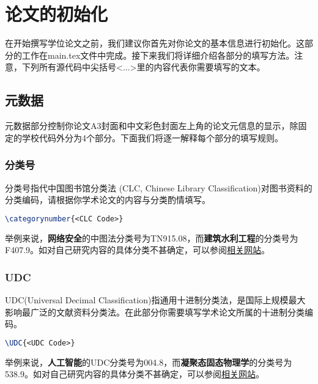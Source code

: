 \chapter{论文的初始化}
\label{chp:initialization}

在开始撰写学位论文之前，我们建议你首先对你论文的基本信息进行初始化。这部分的工作在main.tex文件中完成。接下来我们将详细介绍各部分的填写方法。注意，下列所有源代码中尖括号{\codefont <...>}里的内容代表你需要填写的文本。

\section{元数据}

元数据部分控制你论文A3封面和中文彩色封面左上角的论文元信息的显示，除固定的学校代码外分为4个部分。下面我们将逐一解释每个部分的填写规则。

\subsection{分类号}

分类号指代中国图书馆分类法 (CLC, Chinese Library Classification)对图书资料的分类编码，请根据你学术论文的内容与分类酌情填写。

\begin{tcolorbox}
\begin{lstlisting}[language=TeX]
\categorynumber{<CLC Code>}
\end{lstlisting}
\end{tcolorbox}

\noindent 举例来说，\textbf{网络安全}的中图法分类号为TN915.08，而\textbf{建筑水利工程}的分类号为F407.9。如对自己研究内容的具体分类不甚确定，可以参阅\href{https://www.clcindex.com/}{相关网站}。

\subsection{UDC}

UDC(Universal Decimal Classification)指通用十进制分类法，是国际上规模最大影响最广泛的文献资料分类法。在此部分你需要填写学术论文所属的十进制分类编码。

\begin{tcolorbox}
\begin{lstlisting}[language=TeX]
\UDC{<UDC Code>}
\end{lstlisting}
\end{tcolorbox}

\noindent 举例来说，\textbf{人工智能}的UDC分类号为004.8，而\textbf{凝聚态固态物理学}的分类号为538.9。如对自己研究内容的具体分类不甚确定，可以参阅\href{http://www.udcsummary.info/php/index.php?lang=chi}{相关网站}。


